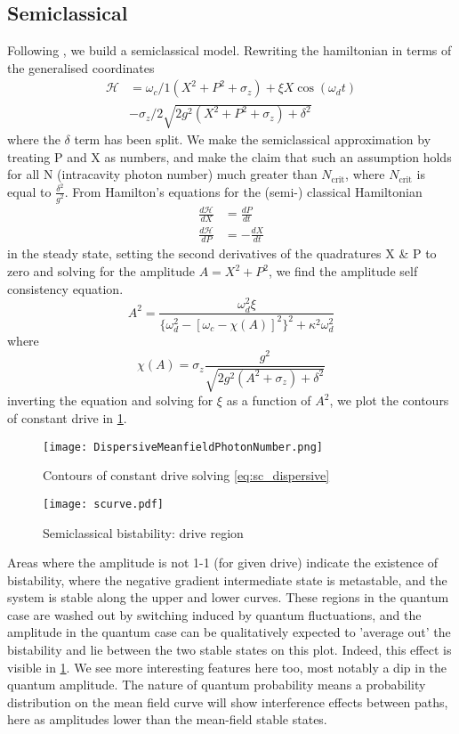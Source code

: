 \subsection{Semiclassical}
Following \cite{Bishop2010}, we build a semiclassical model.
Rewriting the hamiltonian in terms of the generalised coordinates
\begin{align}
        \mathscr{H} &= \omega_c/1 (X^2 + P^2 + \sigma_z) + \xi X \cos(\omega_d t)\\
                    & - \sigma_z /2 \sqrt{2g^2(X^2+P^2+\sigma_z) + \delta^2}
\end{align}
where the $\delta$ term has been split. We make the semiclassical approximation by treating P and X as numbers, and make the claim that such an assumption holds for all N (intracavity photon number) much greater than $N_{\text{crit}}$, where $N_{\text{crit}}$ is equal to $\frac{\delta^2}{g^2}$.
From Hamilton's equations for the (semi-) classical Hamiltonian
\begin{align}
        \frac{d\mathscr{H}}{dX} &= \frac{dP}{dt}\\
        \frac{d\mathscr{H}}{dP} &= -\frac{dX}{dt}
\end{align}
in the steady state, setting the second derivatives of the quadratures X \& P to zero and solving for the amplitude $A = X^2 + P^2$, we find the amplitude self consistency equation.
\begin{equation}
        A^2 = \frac{\omega_d^2\xi}{\{\omega_d^2 - [\omega_c - \chi (A) ]^2 \}^2+ \kappa^2 \omega_d^2}
\end{equation}
where
\begin{equation}
        \chi(A) = \sigma_z \frac{g^2}{\sqrt{2g^2(A^2 + \sigma_z) + \delta^2}}
        \label{eq:sc_dispersive}
\end{equation}
inverting the equation and solving for $\xi$ as a function of $A^2$, we plot the contours of constant drive in \cref{fig:sc_dispersive}.

\begin{figure}
  \texttt{[image: DispersiveMeanfieldPhotonNumber.png]}
  \caption{Contours of constant drive solving \cref{eq:sc_dispersive}}
  \label{fig:sc_dispersive}
\end{figure}
\begin{figure}
  \texttt{[image: scurve.pdf]}  
  \caption{Semiclassical bistability: drive region}
\end{figure}
Areas where the amplitude is not 1-1 (for given drive) indicate the existence of bistability, where the negative gradient intermediate state is metastable, and the system is stable along the upper and lower curves.
These regions in the quantum case are washed out by switching induced by quantum fluctuations, and the amplitude in the quantum case can be qualitatively expected to 'average out' the bistability and lie between the two stable states on this plot.
Indeed, this effect is visible in \cref{fig:sc_dispersive}.
We see more interesting features here too, most notably a dip in the quantum amplitude. The nature of quantum probability means a probability distribution on the mean field curve will show interference effects between paths, here as amplitudes lower than the mean-field stable states.

